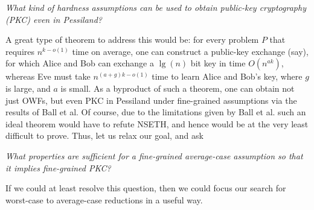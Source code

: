 \begin{center}{\em What kind of hardness assumptions can be used to obtain public-key cryptography (PKC) even in Pessiland?}\end{center} 

A great type of theorem to address this would be: for every problem $P$ that requires $n^{k-o(1)}$ time on average, one can construct a public-key exchange (say), for which Alice and Bob can exchange a $\lg(n)$ bit key in time $O(n^{ak})$, whereas Eve must take $n^{(a+g)k-o(1)}$ time to learn Alice and Bob's key, where $g$ is large, and $a$ is small. As a byproduct of such a theorem, one can obtain not just OWFs, but even PKC in Pessiland under fine-grained assumptions via the results of Ball et al. Of course, due to the limitations given by Ball et al. such an ideal theorem would have to refute NSETH, and hence would be at the very least difficult to prove.
Thus, let us relax our goal, and ask 
\begin{center}{\em What properties are sufficient for a fine-grained average-case assumption so that it implies fine-grained PKC?}\end{center} 

If we could at least resolve this question, then we could focus our search for worst-case to average-case reductions in a useful way.







